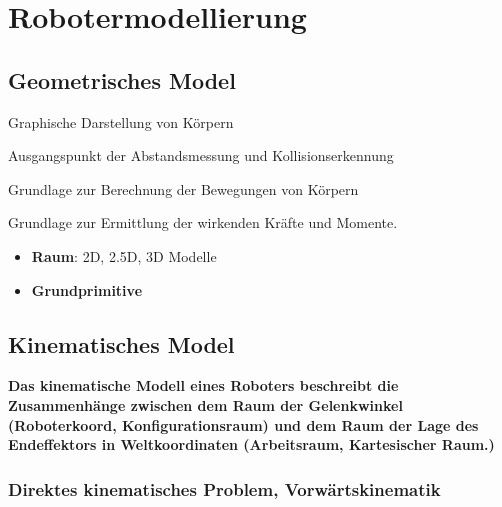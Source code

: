 \chapter{Robotermodellierung}
\section{Geometrisches Model}
\begin{compactitem}
    \item Graphische Darstellung von Körpern
    \item Ausgangspunkt der Abstandsmessung und Kollisionserkennung
    \item Grundlage zur Berechnung der Bewegungen von Körpern
    \item Grundlage zur Ermittlung der wirkenden Kräfte und Momente.
\end{compactitem}

\begin{itemize}
    \item \textbf{Raum}: 2D, 2.5D, 3D Modelle
    \item \textbf{Grundprimitive}
\end{itemize}
\section{Kinematisches Model}
\textbf{Das kinematische Modell eines Roboters beschreibt die Zusammenhänge zwischen
dem Raum der Gelenkwinkel (Roboterkoord, Konfigurationsraum) und dem Raum der
Lage des Endeffektors in Weltkoordinaten (Arbeitsraum, Kartesischer Raum.)}
\subsection{Direktes kinematisches Problem, Vorwärtskinematik}
